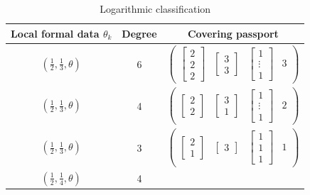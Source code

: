 \documentclass[12]{amsart}
\begin{document}
\begin{table}[h]
\caption{Logarithmic classification}
\begin{center}
\begin{tabular}{|c|c|c|}
\hline 
Local formal data $\theta_k$ & Degree & Covering passport \\
\hline
$( \frac{1}{2}, \frac{1}{3}, \theta)$ & 6 &
$\begin{pmatrix} \left[\begin{matrix}2\\2\\2\end{matrix}\right] & \left[\begin{matrix}3\\3\end{matrix}\right]  &\left[\begin{matrix}1\\ \vdots\\1\end{matrix}\right] & 3\end{pmatrix}$ \\
\hline
$( \frac{1}{2}, \frac{1}{3}, \theta)$ & 4 &
$\begin{pmatrix}  \left[\begin{matrix}2\\2\end{matrix}\right] & \left[\begin{matrix}3\\1\end{matrix}\right] & \left[\begin{matrix}1\\ \vdots\\1\end{matrix}\right] & 2\end{pmatrix}$ \\
\hline$( \frac{1}{2}, \frac{1}{3}, \theta)$ & 3 &
$\begin{pmatrix}  \left[\begin{matrix}2\\1\end{matrix}\right] & \left[\begin{matrix}3\end{matrix}\right] & \left[\begin{matrix}1\\ 1\\1\end{matrix}\right] & 1\end{pmatrix}$ \\
\hline
$( \frac{1}{2}, \frac{1}{4}, \theta)$ & 4 &

\end{tabular}
\end{center}
\end{table}
\end{document}
